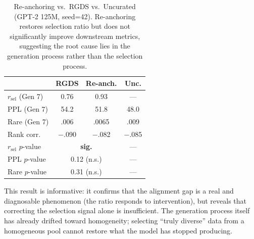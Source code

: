 \documentclass[11pt,a4paper]{article}
\newcommand{\ratio}{\ensuremath{r_{\text{sel}}}}
\begin{document}
\begin{table}[h]
\centering
\small
\begin{tabular}{lccc}
\toprule
& RGDS & Re-anch. & Unc. \\
\midrule
$\ratio$ (Gen 7) & 0.76 & 0.93 & --- \\
PPL (Gen 7) & 54.2 & 51.8 & 48.0 \\
Rare (Gen 7) & .006 & .0065 & .009 \\
Rank corr. & $-$.090 & $-$.082 & $-$.085 \\
\midrule
$\ratio$ $p$-value & \multicolumn{2}{c}{\textbf{sig.}} & --- \\
PPL $p$-value & \multicolumn{2}{c}{0.12 (n.s.)} & --- \\
Rare $p$-value & \multicolumn{2}{c}{0.31 (n.s.)} & --- \\
\bottomrule
\end{tabular}
\caption{Re-anchoring vs.\ RGDS vs.\ Uncurated (GPT-2 125M, seed=42). Re-anchoring restores selection ratio but does not significantly improve downstream metrics, suggesting the root cause lies in the generation process rather than the selection process.}
\label{tab:reanchor}
\end{table}

This result is informative: it confirms that the alignment gap is a real and diagnosable phenomenon (the ratio responds to intervention), but reveals that correcting the selection signal alone is insufficient.
The generation process itself has already drifted toward homogeneity; selecting ``truly diverse'' data from a homogeneous pool cannot restore what the model has stopped producing.
\end{document}
